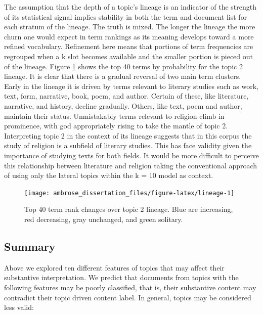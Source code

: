 \documentclass[]{book}
\theoremstyle{definition}
\theoremstyle{definition}
\theoremstyle{definition}
\theoremstyle{remark}
\begin{document}
The assumption that the depth of a topic's lineage is an indicator of
the strength of its statistical signal implies stability in both the
term and document list for each stratum of the lineage. The truth is
mixed. The longer the lineage the more churn one would expect in term
rankings as its meaning develops toward a more refined vocabulary.
Refinement here means that portions of term frequencies are regrouped
when a k slot becomes available and the smaller portion is pieced out of
the lineage. Figure \ref{fig:lineage} shows the top 40 terms by
probability for the topic 2 lineage. It is clear that there is a gradual
reversal of two main term clusters. Early in the lineage it is driven by
terms relevant to literary studies such as work, text, form, narrative,
book, poem, and author. Certain of these, like literature, narrative,
and history, decline gradually. Others, like text, poem and author,
maintain their status. Unmistakably terms relevant to religion climb in
prominence, with god appropriately rising to take the mantle of topic 2.
Interpreting topic 2 in the context of its lineage suggests that in this
corpus the study of religion is a subfield of literary studies. This has
face validity given the importance of studying texts for both fields. It
would be more difficult to perceive this relationship between literature
and religion taking the conventional approach of using only the lateral
topics within the k = 10 model as context.

\begin{figure}

{\centering \texttt{[image: ambrose\_dissertation\_files/figure-latex/lineage-1]} 

}

\caption{Top 40 term rank changes over topic 2 lineage. Blue are increasing, red decreasing, gray unchanged, and green solitary.}\label{fig:lineage}
\end{figure}

\hypertarget{summary}{%
\subsection{Summary}\label{summary}}

Above we explored ten different features of topics that may affect their
substantive interpretation. We predict that documents from topics with
the following features may be poorly classified, that is, their
substantive content may contradict their topic driven content label. In
general, topics may be considered less valid:
\end{document}
